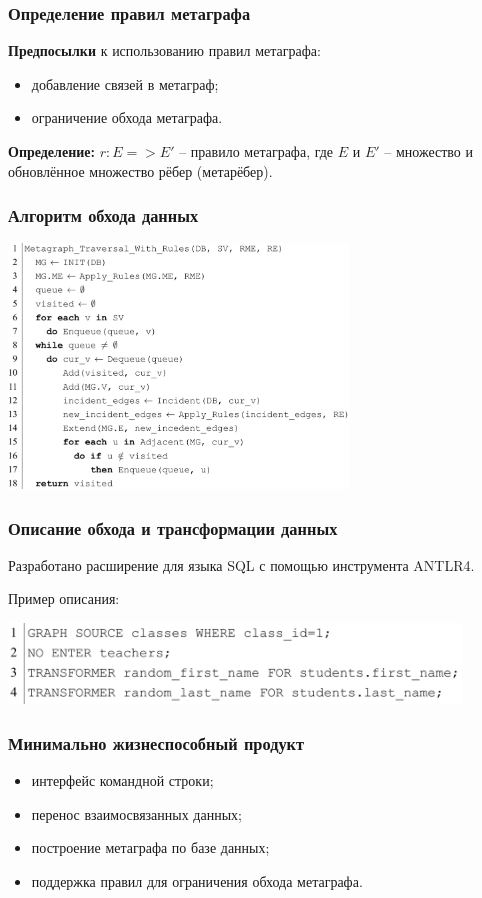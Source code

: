 \documentclass[pdf, hyperref={unicode}, aspectratio=169]{beamer}
\begin{document}
\begin{frame}
\frametitle{Определение правил метаграфа}
	\textbf{Предпосылки} к использованию правил метаграфа:
	\begin{itemize}
		\item добавление связей в метаграф;
		\item ограничение обхода метаграфа.
	\end{itemize}

	\textbf{Определение:} $r: E => E'$ -- правило метаграфа, где $E$ и $E'$ -- множество и обновлённое множество рёбер (метарёбер).
\end{frame}


\begin{frame}
\frametitle{Алгоритм обхода данных}
	\begin{center}
		\includegraphics[height = 6.5cm]{img/algorithm-with-rules}
	\end{center}
\end{frame}


\begin{frame}
\frametitle{Описание обхода и трансформации данных}
	Разработано расширение для языка SQL с помощью инструмента ANTLR4.

	Пример описания:
	\begin{center}
		\includegraphics[width = 12cm]{img/language-1}
	\end{center}
\end{frame}


\begin{frame}
\frametitle{Минимально жизнеспособный продукт}
	\begin{itemize}
		\item интерфейс командной строки;
		\item перенос взаимосвязанных данных;
		\item построение метаграфа по базе данных;
		\item поддержка правил для ограничения обхода метаграфа.
	\end{itemize}
\end{frame}
\end{document}
